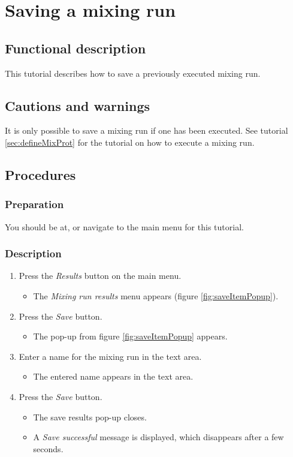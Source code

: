 
\section{Saving a mixing run}
\label{sec:savmixrun}

\subsection{Functional description}
This tutorial describes how to save a previously executed mixing run.

\subsection{Cautions and warnings}
It is only possible to save a mixing run if one has been executed. See tutorial \ref{sec:defineMixProt} for the tutorial on how to execute a mixing run.

\subsection{Procedures}

\subsubsection{Preparation}
You should be at, or navigate to the main menu for this tutorial.

\subsubsection{Description}
\begin{enumerate}
	\item Press the \emph{Results} button on the main menu.
		\begin{itemize}
           \item  The \emph{Mixing run results} menu appears (figure \ref{fig:saveItemPopup}).
		\end{itemize}
	\item Press the \emph{Save} button.
		\begin{itemize}
			\item The pop-up from figure \ref{fig:saveItemPopup} appears.
		\end{itemize}
	\item Enter a name for the mixing run in the text area.
		\begin{itemize}
			\item The entered name appears in the text area.
		\end{itemize}
	\item Press the \emph{Save} button. \label{item:savmixrunName}
		\begin{itemize}
			\item The save results pop-up closes.
			\item A \emph{Save successful} message is displayed, which disappears after a few seconds.
		\end{itemize}
\end{enumerate}

